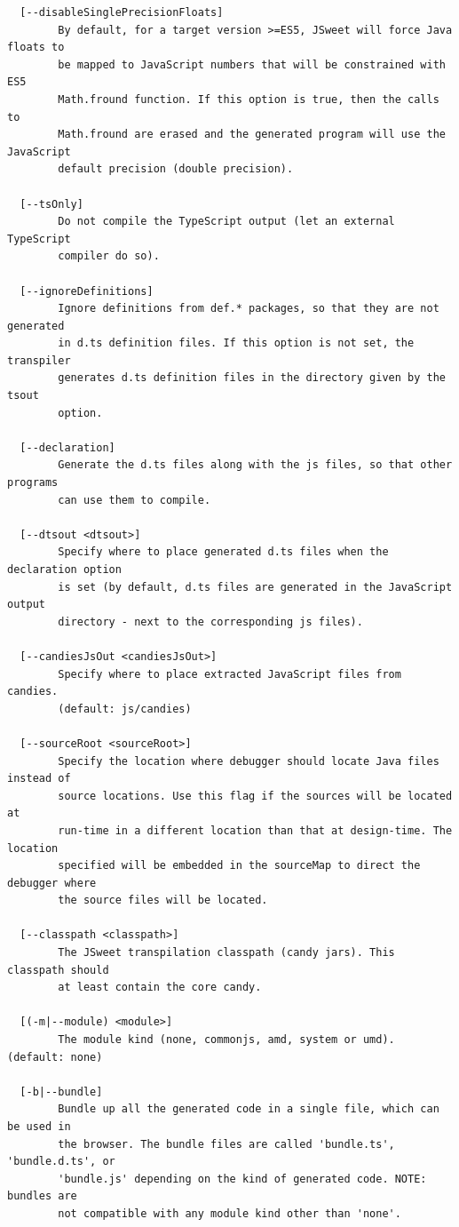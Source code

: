\documentclass[a4paper]{report}
\begin{document}
\begin{small}
\begin{verbatim}
  [--disableSinglePrecisionFloats]
        By default, for a target version >=ES5, JSweet will force Java floats to
        be mapped to JavaScript numbers that will be constrained with ES5
        Math.fround function. If this option is true, then the calls to
        Math.fround are erased and the generated program will use the JavaScript
        default precision (double precision).

  [--tsOnly]
        Do not compile the TypeScript output (let an external TypeScript
        compiler do so).

  [--ignoreDefinitions]
        Ignore definitions from def.* packages, so that they are not generated
        in d.ts definition files. If this option is not set, the transpiler
        generates d.ts definition files in the directory given by the tsout
        option.

  [--declaration]
        Generate the d.ts files along with the js files, so that other programs
        can use them to compile.

  [--dtsout <dtsout>]
        Specify where to place generated d.ts files when the declaration option
        is set (by default, d.ts files are generated in the JavaScript output
        directory - next to the corresponding js files).

  [--candiesJsOut <candiesJsOut>]
        Specify where to place extracted JavaScript files from candies.
        (default: js/candies)

  [--sourceRoot <sourceRoot>]
        Specify the location where debugger should locate Java files instead of
        source locations. Use this flag if the sources will be located at
        run-time in a different location than that at design-time. The location
        specified will be embedded in the sourceMap to direct the debugger where
        the source files will be located.

  [--classpath <classpath>]
        The JSweet transpilation classpath (candy jars). This classpath should
        at least contain the core candy.

  [(-m|--module) <module>]
        The module kind (none, commonjs, amd, system or umd). (default: none)

  [-b|--bundle]
        Bundle up all the generated code in a single file, which can be used in
        the browser. The bundle files are called 'bundle.ts', 'bundle.d.ts', or
        'bundle.js' depending on the kind of generated code. NOTE: bundles are
        not compatible with any module kind other than 'none'.


\end{verbatim}
\end{small}
\end{document}
